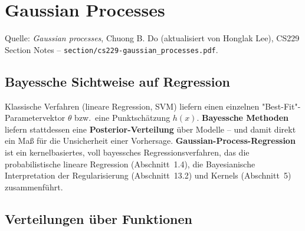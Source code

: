 \documentclass[11pt]{article}
\theoremstyle{csthm}
\theoremstyle{csdef}
\begin{document}
\section{Gaussian Processes}

\begin{tcolorbox}[srcstyle]
Quelle: \emph{Gaussian processes}, Chuong B. Do (aktualisiert von Honglak
Lee), CS229 Section Notes -- \texttt{section/cs229-gaussian\_processes.pdf}.
\end{tcolorbox}

\subsection{Bayessche Sichtweise auf Regression}

Klassische Verfahren (lineare Regression, SVM) liefern einen einzelnen
"Best-Fit"-Parametervektor $\theta$ bzw.\ eine Punktschätzung $h(x)$.
\textbf{Bayessche Methoden} liefern stattdessen eine
\textbf{Posterior-Verteilung} über Modelle -- und damit direkt ein Maß für
die Unsicherheit einer Vorhersage. \textbf{Gaussian-Process-Regression} ist
ein kernelbasiertes, voll bayessches Regressionsverfahren, das die
probabilistische lineare Regression (Abschnitt~1.4), die Bayesianische
Interpretation der Regularisierung (Abschnitt~13.2) und Kernels
(Abschnitt~5) zusammenführt.

\subsection{Verteilungen über Funktionen}
\end{document}
